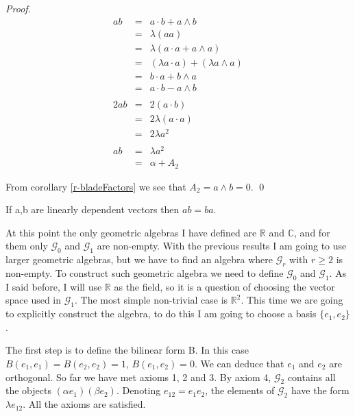 \begin{proof}
\begin{eqnarray*}
ab & = & a \cdot b + a \wedge b \\
& = & \lambda (aa) \\
& = & \lambda (a \cdot a + a \wedge a) \\
& = & (\lambda a \cdot a) + ( \lambda a \wedge a) \\
& = & b \cdot a + b \wedge a \\
& = & a \cdot b - a \wedge b \\
& & \\
2ab & = & 2 (a \cdot b) \\
& = & 2 \lambda (a \cdot a) \\
& = & 2 \lambda a^2 \\
& & \\
ab & = & \lambda a^2 \\
& = & \alpha + A_2
\end{eqnarray*}

From corollary \ref{r-bladeFactors} we see that $A_2 = a \wedge b = 0$.
\qed
\end{proof}

\begin{corollary}
If a,b are linearly dependent vectors then $ab = ba$.
\end{corollary}

At this point the only geometric algebras I have defined are $\mathbb{R}$ and $\mathbb{C}$, and for them only $\mathcal{G}_0$ and $\mathcal{G}_1$ are non-empty. With the previous results I am going to use larger geometric algebras, but we have to find an algebra where $\mathcal{G}_r$ with $r \ge 2$ is non-empty. To construct such geometric algebra we need to define $\mathcal{G}_0$ and $\mathcal{G}_1$. As I said before, I will use $\mathbb{R}$ as the field, so it is a question of choosing the vector space used in  $\mathcal{G}_1$. The most simple non-trivial case is $\mathbb{R}^2$. This time we are going to explicitly construct the algebra, to do this I am going to choose a basis $\{e_1, e_2\}$.

The first step is to define the bilinear form B. In this case $B(e_1,e_1) = B(e_2,e_2) = 1$, $B(e_1,e_2) = 0$. We can deduce that $e_1$ and $e_2$ are orthogonal. So far we have met axioms 1, 2 and 3. By axiom 4, $\mathcal{G}_2$ contains all the objects $(\alpha e_1) (\beta e_2)$.  Denoting $e_{12} = e_1 e_2$, the elements of $\mathcal{G}_2$ have the form $\lambda e_{12}$. All the axioms are satisfied.

